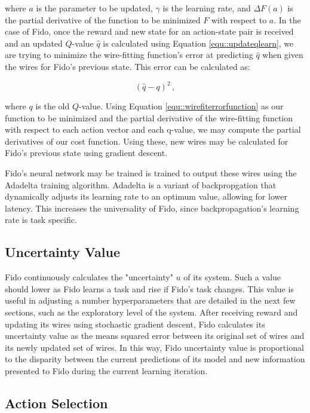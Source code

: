 where $a$ is the parameter to be updated, $\gamma$ is the learning rate, and $\Delta F(a)$ is the partial derivative of the function to be minimized $F$ with respect to $a$.
In the case of Fido, once the reward and new state for an action-state pair is received and an updated $Q$-value $\hat{q}$ is calculated using Equation \ref{equ::updateqlearn}, we are trying to minimize the wire-fitting function's error at predicting $\hat{q}$ when given the wires for Fido's previous state.
This error can be calculated as:

\begin{equation}
	(\hat{q} - q)^2
	\,,
	\label{equ::wirefiterrorfunction}
\end{equation}

\noindent

where $q$ is the old $Q$-value.
Using Equation \ref{equ::wirefiterrorfunction} as our function to be minimized and the partial derivative of the wire-fitting function with respect to each action vector and each q-value, we may compute the partial derivatives of our cost function.
Using these, new wires may be calculated for Fido's previous state using gradient descent.

Fido's neural network may be trained is trained to output these wires using the Adadelta training algorithm. Adadelta is a variant of backpropgation that dynamically adjusts its learning rate to an optimum value, allowing for lower latency. This increases the universality of Fido, since backpropagation's learning rate is task specific. 

\subsection{Uncertainty Value}

Fido continuously calculates the "uncertainty" $u$ of its system. Such a value should lower as Fido learns a task and rise if Fido's task changes. This value is useful in adjusting a number hyperparameters that are detailed in the next few sections, such as the exploratory level of the system. After receiving reward and updating its wires using stochastic gradient descent, Fido calculates its uncertainty value as the means squared error between its original set of wires and its newly updated set of wires. In this way, Fido uncertainty value is proportional to the disparity between the current predictions of its model and new information presented to Fido during the current learning iteration.

\subsection{Action Selection}

